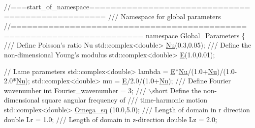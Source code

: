  
\begin{DoxyCodeInclude}
\textcolor{comment}{//===start\_of\_namespace=================================================}
\textcolor{comment}{/// Namespace for global parameters}
\textcolor{comment}{}\textcolor{comment}{//======================================================================}
\textcolor{keyword}{namespace }\hyperlink{namespaceGlobal__Parameters}{Global\_Parameters}
\{\textcolor{comment}{}
\textcolor{comment}{ /// Define Poisson's ratio Nu}
\textcolor{comment}{} std::complex<double> \hyperlink{namespaceGlobal__Parameters_a5978c2a1498ec7775b228a11a3912209}{Nu}(0.3,0.05);
\textcolor{comment}{}
\textcolor{comment}{ /// Define the non-dimensional Young's modulus}
\textcolor{comment}{} std::complex<double> \hyperlink{namespaceGlobal__Parameters_ac74d762d76b56416281173421b018460}{E}(1.0,0.01);

 \textcolor{comment}{// Lame parameters}
 std::complex<double> lambda = \hyperlink{namespaceGlobal__Parameters_ac74d762d76b56416281173421b018460}{E}*\hyperlink{namespaceGlobal__Parameters_a5978c2a1498ec7775b228a11a3912209}{Nu}/(1.0+\hyperlink{namespaceGlobal__Parameters_a5978c2a1498ec7775b228a11a3912209}{Nu})/(1.0-2.0*\hyperlink{namespaceGlobal__Parameters_a5978c2a1498ec7775b228a11a3912209}{Nu});
 std::complex<double> mu = \hyperlink{namespaceGlobal__Parameters_ac74d762d76b56416281173421b018460}{E}/2.0/(1.0+\hyperlink{namespaceGlobal__Parameters_a5978c2a1498ec7775b228a11a3912209}{Nu});
\textcolor{comment}{}
\textcolor{comment}{ /// Define Fourier wavenumber}
\textcolor{comment}{} \textcolor{keywordtype}{int} Fourier\_wavenumber = 3;
\textcolor{comment}{}
\textcolor{comment}{ /// \(\backslash\)short Define the non-dimensional square angular frequency of }
\textcolor{comment}{ /// time-harmonic motion}
\textcolor{comment}{} std::complex<double> \hyperlink{namespaceGlobal__Parameters_aa7f960ed4311ccf6e3dbf9371f13876a}{Omega\_sq} (10.0,5.0);
\textcolor{comment}{}
\textcolor{comment}{ /// Length of domain in r direction}
\textcolor{comment}{} \textcolor{keywordtype}{double} Lr = 1.0;
\textcolor{comment}{}
\textcolor{comment}{ /// Length of domain in z-direction}
\textcolor{comment}{} \textcolor{keywordtype}{double} Lz = 2.0;


\end{DoxyCodeInclude}
